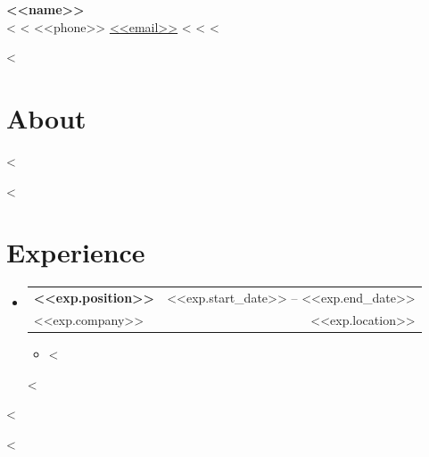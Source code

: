 \documentclass[letterpaper,10pt]{article}
\makeatletter
\newcommand{\resumeItem}[1]{
  \item\small{\color{body}{#1}\vspace{-1pt}}
}
\newcommand{\resumeSubheading}[4]{
  \vspace{2pt}\item
    \begin{tabular*}{0.97\textwidth}[t]{l@{\extracolsep{\fill}}r}
      \textbf{\color{heading}\small#1} & \small\color{subtle}#2 \\
      {\small\color{subtle}#3} & {\small\color{subtle}#4} \\
    \end{tabular*}\vspace{-4pt}
}
\newcommand{\resumeSubHeadingListStart}{\begin{itemize}[leftmargin=0.1in, label={}]}
\newcommand{\resumeSubHeadingListEnd}{\end{itemize}}
\newcommand{\resumeItemListStart}{\begin{itemize}[leftmargin=0.15in, label={\color{subtle}\textperiodcentered}]}
\newcommand{\resumeItemListEnd}{\end{itemize}\vspace{-3pt}}
\makeatother
\begin{document}
\begin{center}
    {\huge\bfseries\color{heading} <<name>>} \\[8pt]
    \small\color{subtle}
    <%
    <%
    <<phone>>
    \enspace\textbar\enspace
    \href{mailto:<<email>>}{<<email>>}
    <%
    <%
    <%
\end{center}
\vspace{-4pt}

<%
\section{About}
  \small\color{body}{<<summary>>}
  \vspace{2pt}
<%

<%
\section{Experience}
  \resumeSubHeadingListStart
<%
    \resumeSubheading
      {<<exp.position>>}{<<exp.start_date>> -- <<exp.end_date>>}
      {<<exp.company>>}{<<exp.location>>}
      \resumeItemListStart
<%
        \resumeItem{<<bullet>>}
<%
      \resumeItemListEnd
<%
  \resumeSubHeadingListEnd
<%

<%
\end{document}
